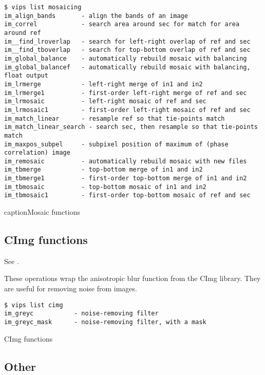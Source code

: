 \begin{fig2}
\begin{verbatim}
$ vips list mosaicing
im_align_bands       - align the bands of an image
im_correl            - search area around sec for match for area around ref
im__find_lroverlap   - search for left-right overlap of ref and sec
im__find_tboverlap   - search for top-bottom overlap of ref and sec
im_global_balance    - automatically rebuild mosaic with balancing
im_global_balancef   - automatically rebuild mosaic with balancing, float output
im_lrmerge           - left-right merge of in1 and in2
im_lrmerge1          - first-order left-right merge of ref and sec
im_lrmosaic          - left-right mosaic of ref and sec
im_lrmosaic1         - first-order left-right mosaic of ref and sec
im_match_linear      - resample ref so that tie-points match
im_match_linear_search - search sec, then resample so that tie-points match
im_maxpos_subpel     - subpixel position of maximum of (phase correlation) image
im_remosaic          - automatically rebuild mosaic with new files
im_tbmerge           - top-bottom merge of in1 and in2
im_tbmerge1          - first-order top-bottom merge of in1 and in2
im_tbmosaic          - top-bottom mosaic of in1 and in2
im_tbmosaic1         - first-order top-bottom mosaic of ref and sec
\end{verbatim}
caption{Mosaic functions}
\label{fg:mosaicing}
\end{fig2}

\subsection{CImg functions}

See .

These operations wrap the anisotropic blur function from the CImg library.
They are useful for removing noise from images.

\begin{fig2}
\begin{verbatim}
$ vips list cimg
im_greyc           - noise-removing filter
im_greyc_mask      - noise-removing filter, with a mask
\end{verbatim}
\caption{CImg functions}
\label{fg:cimg}
\end{fig2}

\subsection{Other}

